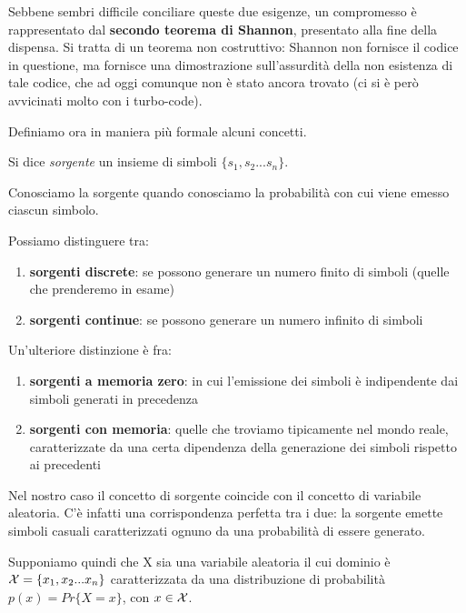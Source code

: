 Sebbene sembri difficile conciliare queste due esigenze, un compromesso è rappresentato dal \textbf{secondo teorema di Shannon}, presentato alla fine della dispensa. Si tratta di un teorema non costruttivo: Shannon non fornisce il codice in questione, ma fornisce una dimostrazione sull'assurdità della non esistenza di tale codice, che ad oggi comunque non è stato ancora trovato (ci si è però avvicinati molto con i turbo-code).

\noindent
Definiamo ora in maniera più formale alcuni concetti.

\begin{definizione}[sorgente]
Si dice \textit{sorgente} un insieme di simboli \(\{s_1, s_2 ... s_n\}\).
\end{definizione}

\noindent
Conosciamo la sorgente quando conosciamo la probabilità con cui viene emesso ciascun simbolo.

\noindent
Possiamo distinguere tra:
\begin{enumerate}
\item \textbf{sorgenti discrete}: se possono generare un numero finito di simboli (quelle che prenderemo in esame)
\item \textbf{sorgenti continue}: se possono generare un numero infinito di simboli
\end{enumerate}

\noindent
Un'ulteriore distinzione è fra:
\begin{enumerate}
\item \textbf{sorgenti a memoria zero}: in cui l'emissione dei simboli è indipendente dai simboli generati in precedenza
\item \textbf{sorgenti con memoria}: quelle che troviamo tipicamente nel mondo reale, caratterizzate da una certa dipendenza della generazione dei simboli rispetto ai precedenti
\end{enumerate}

Nel nostro caso il concetto di sorgente coincide con il concetto di variabile aleatoria. C'è infatti una corrispondenza perfetta tra i due: la sorgente emette simboli casuali caratterizzati ognuno da una probabilità di essere generato.

Supponiamo quindi che X sia una variabile aleatoria il cui dominio è \(\mathcal{X} = \{x_1, x_2 ... x_n\}\) caratterizzata da una distribuzione di probabilità \(p(x) = Pr\{X = x\}\), con \(x \in \mathcal{X}\).

